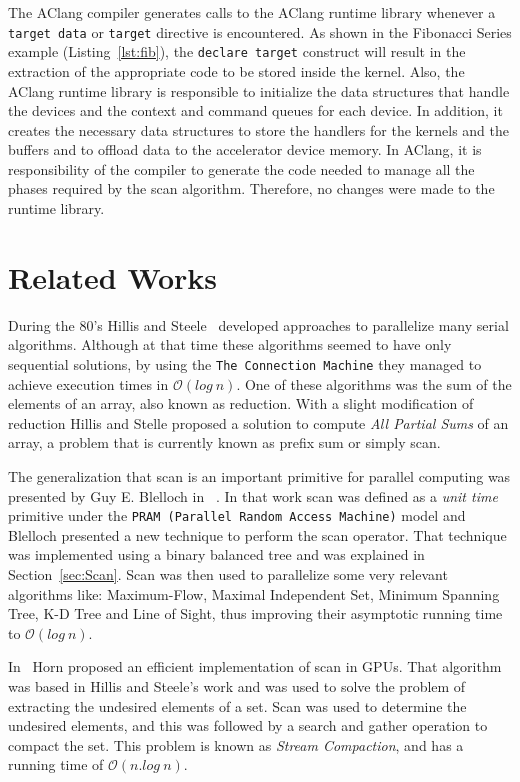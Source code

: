 \documentclass[Ingles]{ic-tese-v1}
\newcommand{\rsec}[1]{Section~\ref{sec:#1}}
\newcommand{\ttt}[1]{{\texttt{#1}}}
\newcommand{\rlst}[1]{Listing~\ref{lst:#1}}
\begin{document}
The AClang compiler generates calls to  the AClang runtime library whenever a
\ttt{target data}  or \ttt{target}  directive is encountered.   As shown  in  the Fibonacci
Series example (\rlst{fib}),  the \ttt{declare  target}
construct will result in the extraction  of the appropriate code to be
stored  inside  the  kernel.  Also,  the  AClang  runtime  library  is
responsible to initialize the data  structures that handle the devices
and the context  and command queues for each device.   In addition, it
creates the  necessary data structures  to store the handlers  for the
kernels and the buffers and to offload data to the accelerator device
memory.  In AClang, it is responsibility of the compiler to generate
the  code needed  to manage  all the  phases required by  the scan  algorithm.
Therefore, no changes were made to the runtime library.

\chapter{Related Works}
\label{cap:RelatedWorks}
During  the 80's  Hillis and  Steele~\cite{dataparallel} developed
approaches to parallelize many serial  algorithms. Although at that time
these algorithms  seemed to have only  sequential solutions, by  using the
\ttt{The  Connection Machine}  \cite{themachine} they  managed to achieve
execution times in $\mathcal{O}(log\ n)$.  One of these algorithms was
the sum of  the elements of an  array, also known as  reduction.  With a
slight modification of reduction Hillis and Stelle proposed a solution
to compute \textit{All Partial Sums} of an array,  a problem that
is currently known as prefix sum or simply scan.

The generalization that scan is an important  primitive
for  parallel  computing  was  presented   by  Guy  E.   Blelloch  in
~\cite{ScanAsPrimitive}. In  that work scan was  defined as a
\textit{unit time}  primitive under the \texttt{PRAM  (Parallel Random
	Access Machine)}  model and  Blelloch presented  a new  technique to
perform  the scan  operator. That  technique was  implemented using  a
binary balanced tree  and was explained in  \rsec{Scan}.  Scan
was  then used   to  parallelize   some  very  relevant   algorithms  like:
Maximum-Flow, Maximal Independent Set, Minimum Spanning Tree, K-D Tree
and Line  of Sight,  thus improving their  asymptotic running  time to
$\mathcal{O}(log\ n)$.

In~\cite{GPUGems2}  Horn  proposed  an  efficient
implementation of  scan in GPUs.   That algorithm was based  in Hillis
and Steele's work and was used  to solve the problem of extracting the
undesired elements  of a set.  Scan  was used to
determine  the undesired elements, and this was followed by a search
and  gather   operation  to   compact the set.  This   problem  is   known  as
\textit{Stream   Compaction},  and has a running  time   of
$\mathcal{O}(n.log\ n)$.
\end{document}
